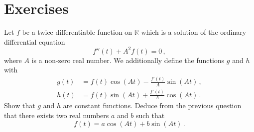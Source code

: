 \section{Exercises}
\begin{ExerciseList}
  \Exercise[label=odesincos] Let $f$ be a twice-differentiable function on $\mathbb{R}$ which is
  a solution of the ordinary differential equation
  \begin{equation}
    f''(t) + A^2 f(t) = 0\,,
  \end{equation}
  where $A$ is a non-zero real number. We additionally define the functions $g$ and $h$
  with
  \begin{align}
    g(t)&=f(t)\cos(At)-\frac{f'(t)}{A}\sin(At)\label{eq:csgdef}\,,\\
    h(t)&=f(t)\sin(At)+\frac{f'(t)}{A}\cos(At)\label{eq:cshdef}\,.
  \end{align}
  \Question Show that $g$ and $h$ are constant functions.
  \Question Deduce from the previous question that there exists two real numbers $a$ and $b$
  such that
  \begin{equation}
    f(t)=a\cos(At)+b\sin(At)\,.\label{eq:csfsol}
  \end{equation}
\end{ExerciseList}

